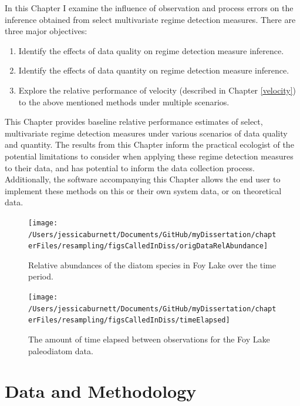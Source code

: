 \documentclass[12pt,twoside,openany]{reedthesis}
\providecommand{\tightlist}{%
  \setlength{\itemsep}{0pt}\setlength{\parskip}{0pt}}
\begin{document}
In this Chapter I examine the influence of observation and process errors on the inference obtained from select multivariate regime detection measures. There are three major objectives:
\begin{enumerate}
\def\labelenumi{\arabic{enumi}.}
\tightlist
\item
  Identify the effects of data quality on regime detection measure inference.
\item
  Identify the effects of data quantity on regime detection measure inference.
\item
  Explore the relative performance of velocity (described in Chapter \ref{velocity}) to the above mentioned methods under multiple scenarios.
\end{enumerate}
This Chapter provides baseline relative performance estimates of select, multivariate regime detection measures under various scenarios of data quality and quantity. The results from this Chapter inform the practical ecologist of the potential limitations to consider when applying these regime detection measures to their data, and has potential to inform the data collection process. Additionally, the software accompanying this Chapter allows the end user to implement these methods on this or their own system data, or on theoretical data.
\begin{figure}[bth]

{\centering \texttt{[image: /Users/jessicaburnett/Documents/GitHub/myDissertation/chapterFiles/resampling/figsCalledInDiss/origDataRelAbundance]} 

}

\caption{Relative abundances of the diatom species in Foy Lake over the time period.}\label{fig:origDat}
\end{figure}
\begin{figure}[bth]

{\centering \texttt{[image: /Users/jessicaburnett/Documents/GitHub/myDissertation/chapterFiles/resampling/figsCalledInDiss/timeElapsed]} 

}

\caption{The amount of time elapsed between observations for the Foy Lake paleodiatom data.}\label{fig:timeElapsed}
\end{figure}
\hypertarget{data-and-methodology}{%
\section{Data and Methodology}\label{data-and-methodology}}
\end{document}
